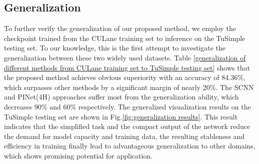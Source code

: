 \documentclass[final]{cvpr}
\begin{document}
\subsection{Generalization}
To further verify the generalization of our proposed method, we employ the checkpoint trained from the CULane training set to inference on the TuSimple testing set. To our knowledge, this is the first attempt to investigate the generalization between these two widely used datasets. Table \ref{generalization of different methods from CULane training set to TuSimple testing set} shows that the proposed method achieves obvious superiority with an accuracy of 84.36\%, which surpasses other methods by a significant margin of nearly 20\%. The SCNN and PINet(4H) approaches suffer most from the generalization ability, which decreases 90\% and 60\% respectively. The generalized visualization results on the TuSimple testing set are shown in Fig.\ref{fig:generalization results}. This result indicates that the simplified task and the compact output of the network reduce the demand for model capacity and training data, the resulting stableness and efficiency in training finally lead to advantageous generalization to other domains, which shows promising potential for application.

\begin{table}[htbp]
	\begin{center}
	\end{center}
	\caption{Evaluation of generalization ability of different methods from CULane training set to TuSimple testing set.}
	\label{generalization of different methods from CULane training set to TuSimple testing set}
\vspace{-1.em}
\end{table}
\end{document}
